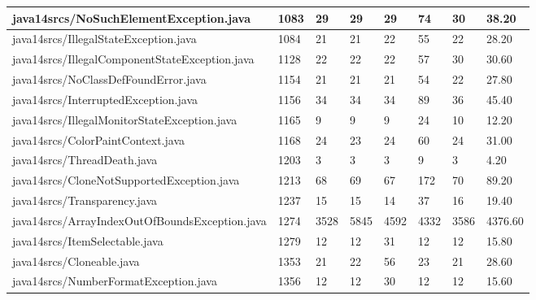 \begin{tabular}{|l|l|l|l|l|l|l|l|}
\hline
java14srcs/NoSuchElementException.java             & 1083        & 29        & 29        & 29        & 74        & 30        & 38.20     \\
\hline
java14srcs/IllegalStateException.java              & 1084        & 21        & 21        & 22        & 55        & 22        & 28.20     \\
\hline
java14srcs/IllegalComponentStateException.java     & 1128        & 22        & 22        & 22        & 57        & 30        & 30.60     \\
\hline
java14srcs/NoClassDefFoundError.java               & 1154        & 21        & 21        & 21        & 54        & 22        & 27.80     \\
\hline
java14srcs/InterruptedException.java               & 1156        & 34        & 34        & 34        & 89        & 36        & 45.40     \\
\hline
java14srcs/IllegalMonitorStateException.java       & 1165        & 9         & 9         & 9         & 24        & 10        & 12.20     \\
\hline
java14srcs/ColorPaintContext.java                  & 1168        & 24        & 23        & 24        & 60        & 24        & 31.00     \\
\hline
java14srcs/ThreadDeath.java                        & 1203        & 3         & 3         & 3         & 9         & 3         & 4.20      \\
\hline
java14srcs/CloneNotSupportedException.java         & 1213        & 68        & 69        & 67        & 172       & 70        & 89.20     \\
\hline
java14srcs/Transparency.java                       & 1237        & 15        & 15        & 14        & 37        & 16        & 19.40     \\
\hline
java14srcs/ArrayIndexOutOfBoundsException.java     & 1274        & 3528      & 5845      & 4592      & 4332      & 3586      & 4376.60   \\
\hline
java14srcs/ItemSelectable.java                     & 1279        & 12        & 12        & 31        & 12        & 12        & 15.80     \\
\hline
java14srcs/Cloneable.java                          & 1353        & 21        & 22        & 56        & 23        & 21        & 28.60     \\
\hline
java14srcs/NumberFormatException.java              & 1356        & 12        & 12        & 30        & 12        & 12        & 15.60     \\

\end{tabular}
